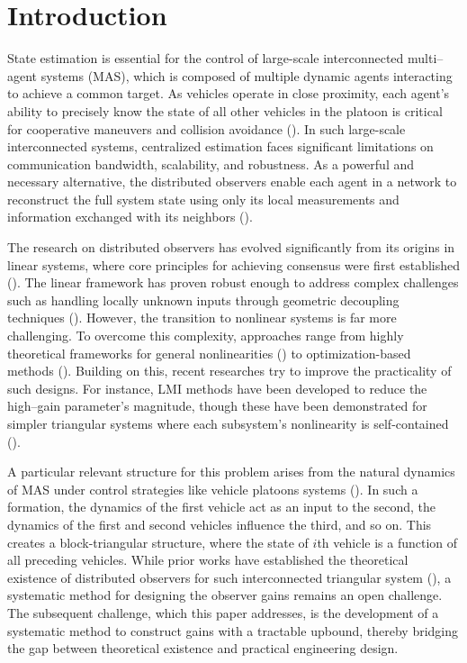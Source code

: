 \documentclass{ifacconf}
\begin{document}
\section{Introduction}
\vspace*{-0.3 cm}
State estimation is essential for the control of large-scale interconnected multi--agent systems (MAS), which is composed of multiple dynamic agents interacting to achieve a common target. 
As vehicles operate in close proximity, each agent's ability to precisely know the state of all other vehicles in the platoon is critical for cooperative maneuvers and collision avoidance (\cite{wang2023adaptive}).
In such large-scale interconnected systems, centralized estimation faces significant limitations on communication bandwidth, scalability, and robustness. As a powerful and necessary alternative, the distributed observers enable each agent in a network to reconstruct the full system state using only its local measurements and information exchanged with its neighbors (\cite{olfati2007consensus}).

The research on distributed observers has evolved significantly from its origins in linear systems, where core principles for achieving consensus were first established (\cite{kim2016distributed,han2018simple}). The linear framework has proven robust enough to address complex challenges such as handling locally unknown inputs through geometric decoupling techniques (\cite{yang2022state}). However, the transition to nonlinear systems is far more challenging. To overcome this complexity, approaches range from highly theoretical frameworks for general nonlinearities (\cite{battilotti2019distributed}) to optimization-based methods (\cite{wang2024distributed}). Building on this, recent researches try to improve the practicality of such designs. For instance, LMI methods have been developed to reduce the high--gain parameter's magnitude, though these have been demonstrated for simpler triangular systems where each subsystem’s nonlinearity is self-contained (\cite{meng2025distributed}).

A particular relevant structure for this problem arises from the natural dynamics of MAS under control strategies like vehicle platoons systems (\cite{wang2021leading}). In such a formation, the dynamics of the first vehicle act as an input to the second, the dynamics of the first and second vehicles influence the third, and so on. This creates a block-triangular structure, where the state of $i$th vehicle is a function of all preceding vehicles. While prior works have established the theoretical existence of distributed observers for such interconnected triangular system (\cite{battilotti2019distributed,wu2021design}), a systematic method for designing the observer gains remains an open challenge. The subsequent challenge, which this paper addresses, is the development of a systematic method to construct gains with a tractable upbound, thereby bridging the gap between theoretical existence and practical engineering design.
\end{document}
